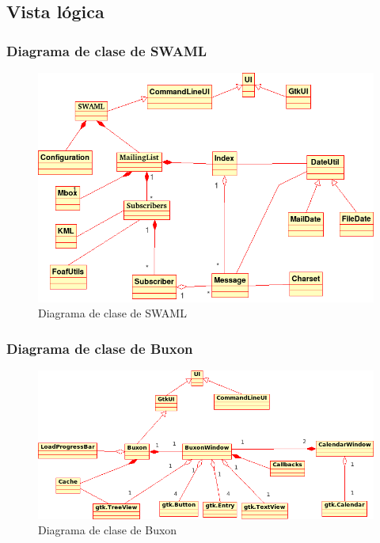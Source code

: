 
\subsection{Vista lógica}

\subsubsection{Diagrama de clase de SWAML}

\begin{figure}[p]
	\centering
 	\includegraphics[width=14cm]{images/uml/clases/swaml.png}
	\caption{Diagrama de clase de SWAML}
	\label{fig:uml:swaml}
\end{figure}

\subsubsection{Diagrama de clase de Buxon}

\begin{figure}[p]
	\centering
 	\includegraphics[width=15cm]{images/uml/clases/buxon.png}
	\caption{Diagrama de clase de Buxon}
	\label{fig:uml:buxon}
\end{figure}
